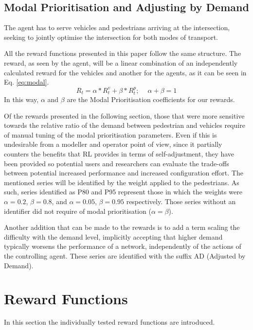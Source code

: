 \documentclass[conference]{IEEEtran}
\begin{document}
\subsection{Modal Prioritisation and Adjusting by Demand}
The agent has to serve vehicles and pedestrians arriving at the intersection, seeking to jointly optimise the intersection for both modes of transport.

All the reward functions presented in this paper follow the same structure.
The reward, as seen by the agent, will be a linear combination of an independently calculated reward for the vehicles and another for the agents, as it can be seen in Eq. \ref{eq:modal}.
\begin{equation}
R_t = \alpha * R^v_t + \beta * R^p_t;\,\,\,\,\,\,\ \alpha+\beta = 1
\label{eq:modal}
\end{equation}
In this way, $\alpha$ and $\beta$ are the Modal Prioritisation coefficients for our rewards.

Of the rewards presented in the following section, those that were more sensitive towards the relative ratio of the demand between pedestrian and vehicles require of manual tuning of the modal prioritisation parameters.
Even if this is undesirable from a modeller and operator point of view, since it partially counters the benefits that RL provides in terms of self-adjustment, they have been provided so potential users and researchers can evaluate the trade-offs between potential increased performance and increased configuration effort.
The mentioned series will be identified by the weight applied to the pedestrians.
As such, series identified as P80 and P95 represent those in which the weights were $\alpha=0.2$, $\beta=0.8$, and $\alpha=0.05$, $\beta=0.95$ respectively. 
Those series without an identifier did not require of modal prioritisation ($\alpha = \beta$).

Another addition that can be made to the rewards is to add a term scaling the difficulty with the demand level, implicitly accepting that higher demand typically worsens the performance of a network, independently of the actions of the controlling agent.
These series are identified with the suffix AD (Adjusted by Demand).
\section{Reward Functions}
\label{rewards}
In this section the individually tested reward functions are introduced.
\end{document}

